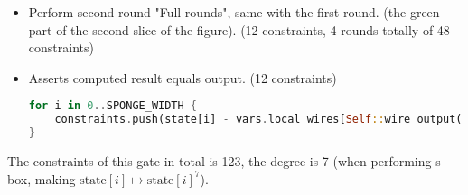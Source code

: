 \begin{itemize}
\begin{itemize}
\begin{itemize}
        \end{itemize}
    \end{itemize}
    \item Perform second round "Full rounds", same with the first round. (the green part of the second slice of the figure). (12 constraints, 4 rounds totally of 48 constraints)
    \item Asserts computed result equals output. (12 constraints)
    \begin{lstlisting}[language=rust]
for i in 0..SPONGE_WIDTH {
    constraints.push(state[i] - vars.local_wires[Self::wire_output(i)]);
}
    \end{lstlisting}
\end{itemize}

The constraints of this gate in total is 123, the degree is 7 (when performing s-box, making $\text{state}[i] \mapsto \text{state}[i]^7$).
